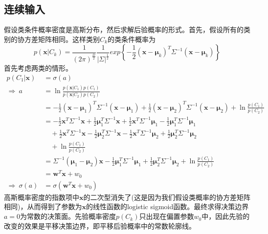 \subsection*{连续输入}
假设类条件概率密度是高斯分布，然后求解后验概率的形式。首先，假设所有的类别的协方差矩阵相同。这样类别$C_k$的类条件概率为
\begin{equation}
	p(\boldsymbol{x}|C_k)=\frac{1}{(2\pi)^{\frac{D}{2}}}\frac{1}{|\Sigma|^{\frac{1}{2}}}exp\left\{-\frac{1}{2}(\boldsymbol{x}-\boldsymbol{\mu}_k)^T\Sigma^{-1}(\boldsymbol{x}-\boldsymbol{\mu}_k) \right\}
\end{equation}
首先考虑两类的情形。
\begin{equation}
\begin{aligned}
	p(C_1|\boldsymbol{x})&=\sigma(a)\\
	\Rightarrow\ a&=\ln \frac{p(\boldsymbol{x}|C_1)p(C_1)}{p(\boldsymbol{x}|C_2)p(C_2)}\\
	&=-\frac{1}{2}(\boldsymbol{x}-\boldsymbol{\mu}_1)^T\Sigma^{-1}(\boldsymbol{x}-\boldsymbol{\mu}_1)+\frac{1}{2}(\boldsymbol{x}-\boldsymbol{\mu}_2)^T\Sigma^{-1}(\boldsymbol{x}-\boldsymbol{\mu}_2)+\ln\frac{p(C_1)}{p(C_2)} \\
	&=-\frac{1}{2}\boldsymbol{x}^T\Sigma^{-1}\boldsymbol{x}+\frac{1}{2}\boldsymbol{\mu}_1^T\Sigma^{-1}\boldsymbol{x}+\frac{1}{2}\boldsymbol{x}^T\Sigma^{-1}\boldsymbol{\mu}_1-\frac{1}{2}\boldsymbol{\mu}_1^T\Sigma^{-1}\boldsymbol{\mu}_1\\
	&\quad +\frac{1}{2}\boldsymbol{x}^T\Sigma^{-1}\boldsymbol{x}-\frac{1}{2}\boldsymbol{\mu}_2^T\Sigma^{-1}\boldsymbol{x}-\frac{1}{2}\boldsymbol{x}^T\Sigma^{-1}\boldsymbol{\mu}_2+\frac{1}{2}\boldsymbol{\mu}_2^T\Sigma^{-1}\boldsymbol{\mu}_2\\
	&\quad +\ln\frac{p(C_1)}{p(C_2)}\\
	&=\Sigma^{-1}(\boldsymbol{\mu}_1-\boldsymbol{\mu}_2)\boldsymbol{x} - \frac{1}{2}\boldsymbol{\mu}_1^T\Sigma^{-1}\boldsymbol{\mu}_1+\frac{1}{2}\boldsymbol{\mu}_2^T\Sigma^{-1}\boldsymbol{\mu}_2+\ln\frac{p(C_1)}{p(C_2)}\\
	&=\boldsymbol{w}^T\boldsymbol{x}+w_0\\
	\Rightarrow \ \sigma(a)&=\sigma(\boldsymbol{w}^T\boldsymbol{x}+w_0)
\end{aligned}	
\end{equation}
高斯概率密度的指数项中$\boldsymbol{x}$的二次型消失了(这是因为我们假设类概率的协方差矩阵相同)，从而得到了参数为$\boldsymbol{x}$的线性函数的logistic sigmoid函数。最终求得决策边界$a=0$为常数的决策面。先验概率密度$p(C_k)$只出现在偏置参数$w_0$中，因此先验的改变的效果是平移决策边界，即平移后验概率中的常数轮廓线。

